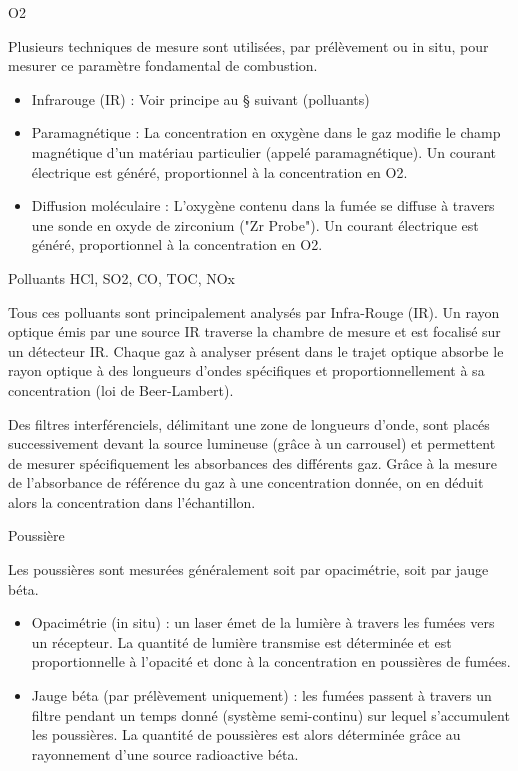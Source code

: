\vspace{0.3cm}
O2
\vspace{0.3cm}

Plusieurs techniques de mesure sont utilisées, par prélèvement ou in situ, pour mesurer ce paramètre fondamental de combustion.
\begin{itemize}
 
 \item 	Infrarouge (IR) : Voir principe au § suivant (polluants)
 \item 	Paramagnétique : La concentration en oxygène dans le gaz modifie le champ magnétique d'un matériau particulier (appelé paramagnétique). Un courant électrique est généré, proportionnel à la concentration en O2.
 \item 	Diffusion moléculaire : L'oxygène contenu dans la fumée se diffuse à travers une sonde en oxyde de zirconium ("Zr Probe"). Un courant électrique est généré, proportionnel à la concentration en O2.
\end{itemize}

\vspace{0.3cm}
Polluants HCl, SO2, CO, TOC, NOx
\vspace{0.3cm}

Tous ces polluants sont principalement analysés par Infra-Rouge (IR).
Un rayon optique émis par une source IR traverse la chambre de mesure et est focalisé sur un détecteur IR. Chaque gaz à analyser présent dans le trajet optique absorbe le rayon optique à des longueurs d’ondes spécifiques et proportionnellement à sa concentration (loi de Beer-Lambert). 
\vspace{0.3cm}

Des filtres interférenciels, délimitant une zone de longueurs d’onde, sont placés successivement devant la source lumineuse (grâce à un carrousel) et permettent de mesurer spécifiquement les absorbances des différents gaz. Grâce à la mesure de l’absorbance de référence du gaz à une concentration donnée, on en déduit alors la concentration dans l’échantillon.

\vspace{0.3cm}
Poussière
\vspace{0.3cm}

Les poussières sont mesurées généralement soit par opacimétrie, soit par jauge béta.
\begin{itemize}
\item Opacimétrie (in situ) : un laser émet de la lumière à travers les fumées vers un récepteur. La quantité de lumière transmise est déterminée et est proportionnelle à l’opacité et donc à la concentration en poussières de fumées.
\item Jauge béta (par prélèvement uniquement) : les fumées passent à travers un filtre pendant un temps donné (système semi-continu) sur lequel s’accumulent les poussières. La quantité de poussières est alors déterminée grâce au rayonnement d’une source radioactive béta.
\end{itemize}


